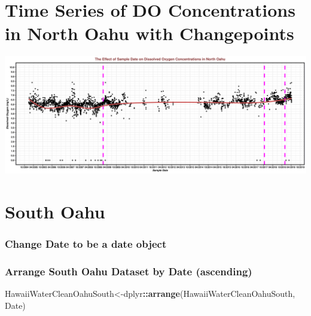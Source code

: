 \documentclass[12pt,]{article}
\newenvironment{Shaded}{\begin{snugshade}}{\end{snugshade}}
\newcommand{\KeywordTok}[1]{\textcolor[rgb]{0.13,0.29,0.53}{\textbf{#1}}}
\newcommand{\DataTypeTok}[1]{\textcolor[rgb]{0.13,0.29,0.53}{#1}}
\newcommand{\StringTok}[1]{\textcolor[rgb]{0.31,0.60,0.02}{#1}}
\newcommand{\OperatorTok}[1]{\textcolor[rgb]{0.81,0.36,0.00}{\textbf{#1}}}
\newcommand{\NormalTok}[1]{#1}
\begin{document}
\section{Time Series of DO Concentrations in North Oahu with
Changepoints}\label{time-series-of-do-concentrations-in-north-oahu-with-changepoints}

\includegraphics{Garcia_ENV872_Project_files/figure-latex/North Oahu-1.pdf}

\section{South Oahu}\label{south-oahu}

\subsubsection{Change Date to be a date
object}\label{change-date-to-be-a-date-object-1}

\begin{Shaded}
\end{Shaded}

\subsubsection{Arrange South Oahu Dataset by Date
(ascending)}\label{arrange-south-oahu-dataset-by-date-ascending}

\begin{Shaded}
\begin{Highlighting}[]
\NormalTok{HawaiiWaterCleanOahuSouth<-dplyr}\OperatorTok{::}\KeywordTok{arrange}\NormalTok{(HawaiiWaterCleanOahuSouth, Date)}
\end{Highlighting}
\end{Shaded}
\end{document}
